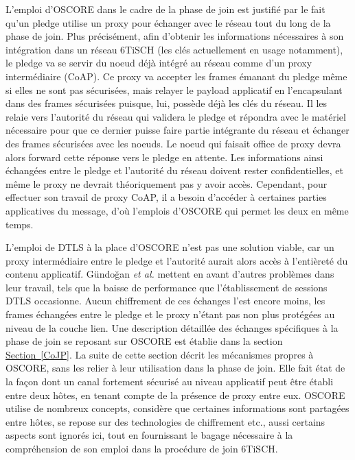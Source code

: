 \documentclass[]{report}
\newcommand{\wordlink}[2]{\hyperref[#2]{#1~\ref{#2}}}
\begin{document}
\par L'emploi d'OSCORE dans le cadre de la phase de join est justifié par le fait qu'un pledge utilise un proxy pour échanger avec le réseau tout du long de la phase de join. Plus précisément, afin d'obtenir les informations nécessaires à son intégration dans un réseau 6TiSCH (les clés actuellement en usage notamment), le pledge va se servir du noeud déjà intégré au réseau comme d'un proxy intermédiaire (CoAP). Ce proxy va accepter les frames émanant du pledge même si elles ne sont pas sécurisées, mais relayer le payload applicatif en l'encapsulant dans des frames sécurisées puisque, lui, possède déjà les clés du réseau. Il les relaie vers l'autorité du réseau qui validera le pledge et répondra avec le matériel nécessaire pour que ce dernier puisse faire partie intégrante du réseau et échanger des frames sécurisées avec les noeuds. Le noeud qui faisait office de proxy devra alors forward cette réponse vers le pledge en attente. Les informations ainsi échangées entre le pledge et l'autorité du réseau doivent rester confidentielles, et même le proxy ne devrait théoriquement pas y avoir accès. Cependant, pour effectuer son travail de proxy CoAP, il a besoin d'accéder à certaines parties applicatives du message, d'où l'emplois d'OSCORE qui permet les deux en même temps.\\

\par L'emploi de DTLS à la place d'OSCORE n'est pas une solution viable, car un proxy intermédiaire entre le pledge et l'autorité aurait alors accès à l'entièreté du contenu applicatif. Gündoğan \textit{et al.} \cite{OSCOREvsNDN} mettent en avant d'autres problèmes dans leur travail, tels que la baisse de performance que l'établissement de sessions DTLS occasionne. Aucun chiffrement de ces échanges l'est encore moins, les frames échangées entre le pledge et le proxy n'étant pas non plus protégées au niveau de la couche lien. Une description détaillée des échanges spécifiques à la phase de join se reposant sur OSCORE est établie dans la section \wordlink{Section}{CoJP}. La suite de cette section décrit les mécanismes propres à OSCORE, sans les relier à leur utilisation dans la phase de join. Elle fait état de la façon dont un canal fortement sécurisé au niveau applicatif peut être établi entre deux hôtes, en tenant compte de la présence de proxy entre eux. OSCORE utilise de nombreux concepts, considère que certaines informations sont partagées entre hôtes, se repose sur des technologies de chiffrement etc., aussi certains aspects sont ignorés ici, tout en fournissant le bagage nécessaire à la compréhension de son emploi dans la procédure de join 6TiSCH.\\
\end{document}
